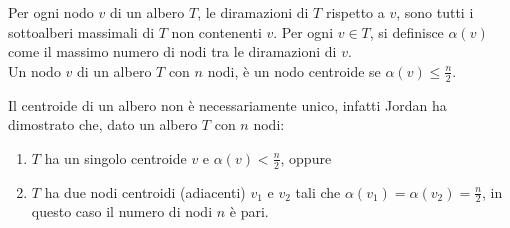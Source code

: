 \begin{definizione}
Per ogni nodo $ v $ di un albero $ T $, le diramazioni di $ T $  rispetto a $ v $, sono tutti i sottoalberi massimali di $ T $ non contenenti $ v $. 
Per ogni $ v \in T $, si definisce $\alpha(v)$ come il massimo numero di nodi tra le diramazioni di $ v $.\\
Un nodo $ v $ di un albero $ T $ con $ n $ nodi, \`e un nodo centroide se $\alpha(v)\le\frac{n}{2}$.
\end{definizione}\mbox{}

Il centroide di un albero non \`e necessariamente unico, infatti Jordan \cite{jordan1869assemblages}  ha dimostrato che, dato un albero $ T $ con $ n $ nodi:
\begin{enumerate}
	\renewcommand{\labelenumi}{\roman{enumi}}
	\item $ T $ ha un singolo centroide $ v $ e $\alpha(v) < \frac{n}{2}$, oppure
	\item$ T $ ha due nodi centroidi (adiacenti) $v_1$ e $v_2$ tali che $\alpha(v_1) = \alpha(v_2) = \frac{n}{2}$, in questo caso il numero di nodi $ n $ \`e pari.
\end{enumerate}

